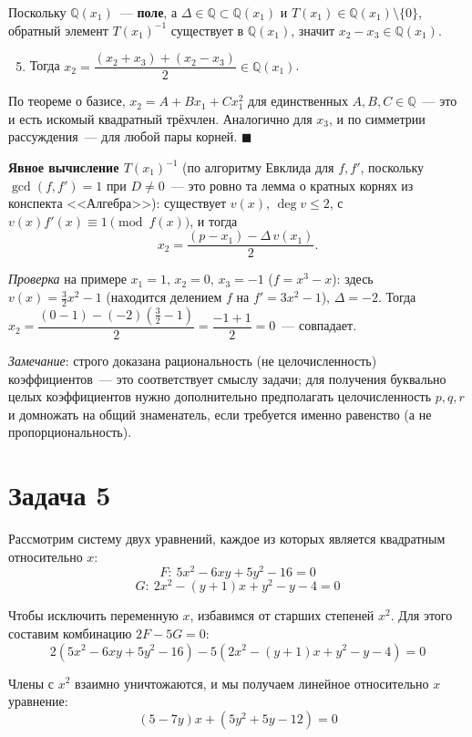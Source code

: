 \documentclass[12pt]{article}
\begin{document}
	Поскольку $\mathbb{Q}(x_1)$~--- \textbf{поле}, а $\Delta\in\mathbb{Q}\subset\mathbb{Q}(x_1)$ и $T(x_1)\in\mathbb{Q}(x_1)\setminus\{0\}$, обратный элемент $T(x_1)^{-1}$ существует в $\mathbb{Q}(x_1)$, значит $x_2-x_3\in\mathbb{Q}(x_1)$.
	
	\begin{enumerate}
		\setcounter{enumi}{4}
		\item Тогда $x_2=\dfrac{(x_2+x_3)+(x_2-x_3)}{2}\in\mathbb{Q}(x_1)$.
	\end{enumerate}
	
	По теореме о базисе, $x_2=A+Bx_1+Cx_1^2$ для единственных $A,B,C\in\mathbb{Q}$~--- это и есть искомый квадратный трёхчлен. Аналогично для $x_3$, и по симметрии рассуждения~--- для любой пары корней. $\blacksquare$
	
	\textbf{Явное вычисление $T(x_1)^{-1}$} (по алгоритму Евклида для $f,f'$, поскольку $\gcd(f,f')=1$ при $D\ne0$~--- это ровно та лемма о кратных корнях из конспекта <<Алгебра>>): существует $v(x)$, $\deg v\leqslant2$, с $v(x)f'(x)\equiv1\pmod{f(x)}$, и тогда
	\[
	x_2=\frac{(p-x_1)-\Delta\,v(x_1)}{2}.
	\]
	
	\textit{Проверка} на примере $x_1=1$, $x_2=0$, $x_3=-1$ ($f=x^3-x$): здесь $v(x)=\tfrac32x^2-1$ (находится делением $f$ на $f'=3x^2-1$), $\Delta=-2$. Тогда $x_2=\dfrac{(0-1)-(-2)(\tfrac32-1)}{2}=\dfrac{-1+1}{2}=0$~--- совпадает.
	
	\textit{Замечание}: строго доказана рациональность (не целочисленность) коэффициентов~--- это соответствует смыслу задачи; для получения буквально целых коэффициентов нужно дополнительно предполагать целочисленность $p,q,r$ и домножать на общий знаменатель, если требуется именно равенство (а не пропорциональность).
	
	\section*{Задача 5}
	
	Рассмотрим систему двух уравнений, каждое из которых является квадратным относительно $x$:
	\[
		F:\ 5x^2 - 6xy + 5y^2 - 16 = 0
	\]
	\[
		G:\ 2x^2 - (y + 1)x + y^2 - y - 4 = 0
	\]
	
	Чтобы исключить переменную $x$, избавимся от старших степеней $x^2$. Для этого составим комбинацию $2F - 5G = 0$:
	\[
		2(5x^2 - 6xy + 5y^2 - 16) - 5(2x^2 - (y + 1)x + y^2 - y - 4) = 0
	\]
	
	Члены с $x^2$ взаимно уничтожаются, и мы получаем линейное относительно $x$ уравнение:
	\[
		(5 - 7y)x + (5y^2 + 5y - 12) = 0
	\]
	
\end{document}
